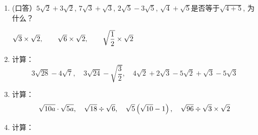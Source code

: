 \begin{ex}
\begin{enumerate}
    \item (口答）$5\sqrt{2}+3\sqrt{2}$, $7\sqrt{3}+\sqrt{3}$, $2\sqrt{5}-3\sqrt{5}$, $\sqrt{4}+\sqrt{5}$是否等于$\sqrt{4+5}$, 为什么？

    $\sqrt{3}\times \sqrt{2},\qquad \sqrt{6}\times \sqrt{2},\qquad \sqrt{\dfrac{1}{2}}\times \sqrt{2}$

    \item 计算：
    \[3\sqrt{28}-4\sqrt{7},\quad 3\sqrt{24}-\sqrt{\frac{3}{2}},\quad 4\sqrt{2}+2\sqrt{3}-5\sqrt{2}+\sqrt{3}-5\sqrt{3}\]

    \item 计算：
    \[\sqrt{10a}\cdot \sqrt{5a},\quad \sqrt{18}\div \sqrt{6},\quad \sqrt{5}\left(\sqrt{10}-1\right),\quad \sqrt{96}\div \sqrt{3}\times \sqrt{2}\]
    \item 计算：
    \begin{enumerate}
    \end{enumerate}
\end{enumerate}
\end{ex}

